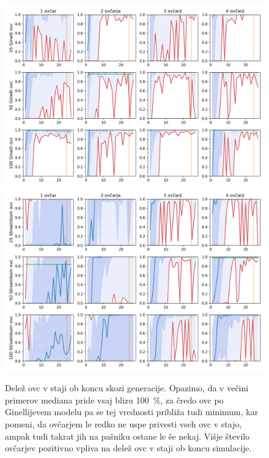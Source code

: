 \begin{figure}[H]  %
	\centering
	\includegraphics[height=0.4\textheight]{../poglavja/grafi/Ginelli-evolucija-Uspeh.png}
	\includegraphics[height=0.4\textheight]{../poglavja/grafi/Stroembom-evolucija-Uspeh.png}
	\caption[Delež ovc v staji ob koncu skozi generacije]{Delež ovc v staji ob koncu skozi generacije. Opazimo, da v večini primerov mediana pride vsaj blizu 100~\%, za čredo ovc po Ginellijevem modelu pa se tej vrednosti približa tudi minimum, kar pomeni, da ovčarjem le redko ne uspe privesti vseh ovc v stajo, ampak tudi takrat jih na pašniku ostane le še nekaj. Višje število ovčarjev pozitivno vpliva na delež ovc v staji ob koncu simulacije.} %
	\label{fig:uspeh}
\end{figure}

